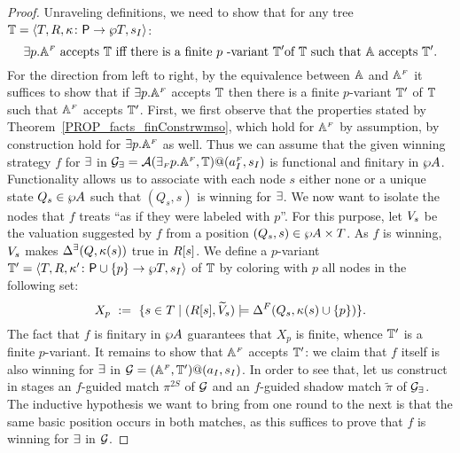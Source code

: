 \begin{proof}
Unraveling definitions, we need to show that for any tree $\mathbb{T} = \langle{T,R,\kappa\colon
\mathsf{P}\to \wp T,s_I}\rangle$:
$${{\exists} p}.\aut^{\fin} \text{ accepts } \bbT \text{ iff } \text{there is a
finite }p \text{ -variant }\bbT' \text{of } \bbT \text{  such that } \aut 
\text{  accepts } \bbT'.
$$
For the direction from left to right, by the equivalence between $\mathbb{A}$ and 
$\mathbb{A}^{{\scriptscriptstyle F}}$ it suffices to show that if ${{\exists} p}.\mathbb{A}^{{\scriptscriptstyle F}}$ accepts
$\mathbb{T}$ then there is a finite $p$-variant $\mathbb{T}'$ of $\mathbb{T}$ such that 
$\mathbb{A}^{{\scriptscriptstyle F}}$ accepts $\mathbb{T}'$. 
First, we first observe that the properties stated by Theorem~\ref{PROP_facts_finConstrwmso}, which hold for $\mathbb{A}^{{\scriptscriptstyle F}}$ by assumption, by construction hold for ${{\exists} p}.\mathbb{A}^{{\scriptscriptstyle F}}$ as well. Thus we can assume that the given winning strategy $f$ for $\exists$ in $\mathcal{G_{\exists}} = \mathcal{A}({\exists_{{\scriptscriptstyle F}} p}.\mathbb{A}^{{\scriptscriptstyle F}},\mathbb{T})@(a_I^{{\scriptscriptstyle F}},s_I)$ is functional and finitary in $\wp A$. Functionality allows us to associate with each node $s$ either none or a unique state $Q_s \in \wp A$ such that $(Q_s,s)$ is winning for $\exists$. We now want to isolate the nodes that $f$ treats ``as if they were labeled with $p$''. For this purpose, let $V_{s}$ be the valuation suggested by $f$ from a position $(Q_s,s) \in \wp A \times T$. As $f$ is winning, $V_{s}$ makes $\Delta^\exists(Q,\kappa(s))$ true in $R[s]$. We define a $p$-variant $\mathbb{T}' = \langle{T,R,\kappa' \colon \mathsf{P}\cup\{p\} \to \wp T,s_I}\rangle$ of $\mathbb{T}$ by coloring with $p$ all nodes in the following set:
 \begin{equation}\label{eq:X_p}
   X_p\ :=\ \{s \in T\mid (\R{s},\widetilde{\val}_{s}) \models \tmap^{\f}(Q_s,\tscolors(s)\cup\{p\})\}.
\end{equation}
The fact that $f$ is finitary in $\wp A$ guarantees that $X_p$ is finite, whence $\mathbb{T}'$ is a finite $p$-variant. It remains to show that $\mathbb{A}^{{\scriptscriptstyle F}}$ accepts $\mathbb{T}'$: we claim that $f$ itself is also winning for $\exists$ in $\mathcal{G} = (\mathbb{A}^{{\scriptscriptstyle F}},\mathbb{T}')@(a_I,s_I)$. In order to see that, let us construct in stages an $f$-guided match $\pi^{2S}$ of $\mathcal{G}$ and an $f$-guided shadow match $\tilde{\pi}$ of $\mathcal{G_{\exists}}$. The inductive hypothesis we want to bring from one round to the next is that the same basic position occurs in both matches, as this suffices to prove that $f$ is winning for $\exists$ in $\mathcal{G}$.


\end{proof}
